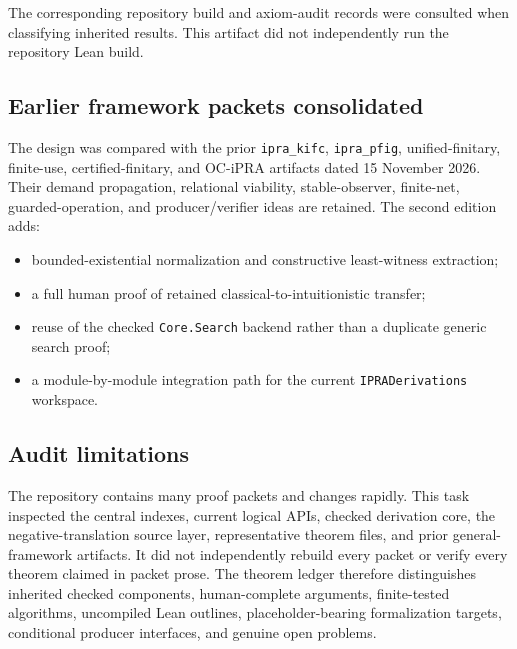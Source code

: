 The corresponding repository build and axiom-audit records were consulted when classifying inherited results.  This artifact did not independently run the repository Lean build.

\subsection{Earlier framework packets consolidated}

The design was compared with the prior \texttt{ipra\_kifc}, \texttt{ipra\_pfig}, unified-finitary, finite-use, certified-finitary, and OC-iPRA artifacts dated 15 November 2026.  Their demand propagation, relational viability, stable-observer, finite-net, guarded-operation, and producer/verifier ideas are retained.  The second edition adds:
\begin{itemize}
  \item bounded-existential normalization and constructive least-witness extraction;
  \item a full human proof of retained classical-to-intuitionistic transfer;
  \item reuse of the checked \texttt{Core.Search} backend rather than a duplicate generic search proof;
  \item a module-by-module integration path for the current \texttt{IPRADerivations} workspace.
\end{itemize}

\subsection{Audit limitations}

The repository contains many proof packets and changes rapidly.  This task inspected the central indexes, current logical APIs, checked derivation core, the negative-translation source layer, representative theorem files, and prior general-framework artifacts.  It did not independently rebuild every packet or verify every theorem claimed in packet prose.  The theorem ledger therefore distinguishes inherited checked components, human-complete arguments, finite-tested algorithms, uncompiled Lean outlines, placeholder-bearing formalization targets, conditional producer interfaces, and genuine open problems.
